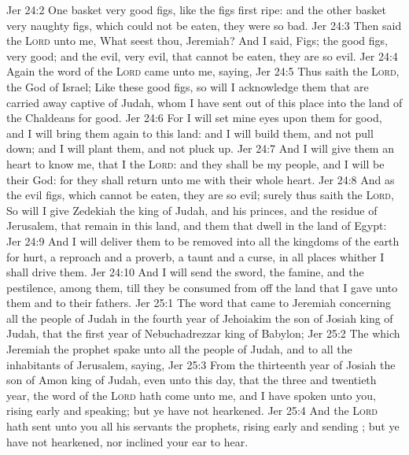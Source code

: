\vs Jer 24:2 One basket  very good figs,  like the figs  first ripe: and the other basket  very naughty figs, which could not be eaten, they were so bad.
\vs Jer 24:3 Then said the \textsc{Lord} unto me, What seest thou, Jeremiah? And I said, Figs; the good figs, very good; and the evil, very evil, that cannot be eaten, they are so evil.
\vs Jer 24:4 Again the word of the \textsc{Lord} came unto me, saying,
\vs Jer 24:5 Thus saith the \textsc{Lord}, the God of Israel; Like these good figs, so will I acknowledge them that are carried away captive of Judah, whom I have sent out of this place into the land of the Chaldeans for  good.
\vs Jer 24:6 For I will set mine eyes upon them for good, and I will bring them again to this land: and I will build them, and not pull  down; and I will plant them, and not pluck  up.
\vs Jer 24:7 And I will give them an heart to know me, that I  the \textsc{Lord}: and they shall be my people, and I will be their God: for they shall return unto me with their whole heart.
\vs Jer 24:8 And as the evil figs, which cannot be eaten, they are so evil; surely thus saith the \textsc{Lord}, So will I give Zedekiah the king of Judah, and his princes, and the residue of Jerusalem, that remain in this land, and them that dwell in the land of Egypt:
\vs Jer 24:9 And I will deliver them to be removed into all the kingdoms of the earth for  hurt,  a reproach and a proverb, a taunt and a curse, in all places whither I shall drive them.
\vs Jer 24:10 And I will send the sword, the famine, and the pestilence, among them, till they be consumed from off the land that I gave unto them and to their fathers.
\vs Jer 25:1 The word that came to Jeremiah concerning all the people of Judah in the fourth year of Jehoiakim the son of Josiah king of Judah, that  the first year of Nebuchadrezzar king of Babylon;
\vs Jer 25:2 The which Jeremiah the prophet spake unto all the people of Judah, and to all the inhabitants of Jerusalem, saying,
\vs Jer 25:3 From the thirteenth year of Josiah the son of Amon king of Judah, even unto this day, that  the three and twentieth year, the word of the \textsc{Lord} hath come unto me, and I have spoken unto you, rising early and speaking; but ye have not hearkened.
\vs Jer 25:4 And the \textsc{Lord} hath sent unto you all his servants the prophets, rising early and sending ; but ye have not hearkened, nor inclined your ear to hear.

